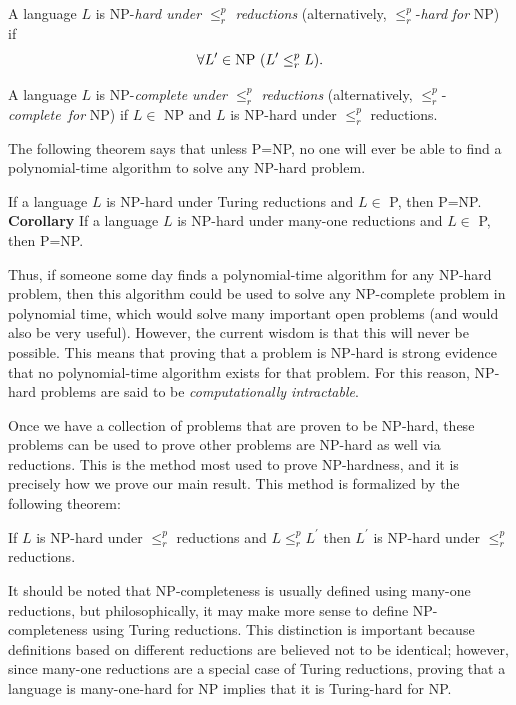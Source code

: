 \begin{definition}
{\rm A language $L$ is NP-{\em hard under $\leq^p_r$ reductions\/}
(alternatively, \mbox{$\leq^p_r$-{\em hard}} {\em for\/} NP) if
$$
  \forall L^\prime\in {\rm NP}\ (L^\prime\leq^p_r L).
$$}
\end{definition}

\begin{definition}
{\rm A language $L$ is NP-{\em complete under $\leq^p_r$ reductions\/}
(alternatively, \mbox{$\leq^p_r$-{\em complete for\/}} NP) if $L\in$ NP and
$L$ is NP-hard under $\leq^p_r$ reductions.}
\end{definition}

The following theorem says that unless P=NP, no one will ever be able to 
find a polynomial-time algorithm to solve any NP-hard problem.

\begin{theorem}
If a language $L$ is\/ {\rm NP}-hard under Turing reductions and $L\in$
{\rm P}, then\/ {\rm P=NP}.\\[1pc]
{\rm\bf Corollary} If a language $L$ is\/ {\rm NP}-hard under many-one
reductions and $L\in$ {\rm P}, then\/ {\rm P=NP}.
\end{theorem}

Thus, if someone some day finds a polynomial-time algorithm
for any NP-hard problem, then this algorithm could be used to solve any
NP-complete problem in polynomial time, which would solve many important
open problems (and would also be very useful).  However, the current
wisdom is that this will never be possible.  This means that proving that a
problem is NP-hard is strong evidence that no polynomial-time algorithm
exists for that problem.  For this reason, NP-hard problems are said to be
{\em computationally intractable}.

Once we have a collection of problems that are proven to be NP-hard,
these problems can be used to prove other problems are NP-hard as well via
reductions.  This is the method most used to prove NP-hardness, and it is
precisely how we prove our main result.
This method is formalized by the following theorem:

\begin{theorem}
If $L$ is\/ {\rm NP}-hard under $\leq^p_r$ reductions and
$L \leq^p_r L^\prime$ then $L^\prime$ is\/ {\rm NP}-hard under
$\leq^p_r$ reductions.
\end{theorem}

It should be noted that NP-completeness is usually defined using many-one
reductions, but philosophically, it may make more sense to define
NP-completeness using Turing reductions.  This distinction is important
because definitions based on different reductions are believed not to be
identical; however, since many-one reductions are a special case of Turing
reductions, proving that a language is many-one-hard for NP implies that it
is Turing-hard for NP.


